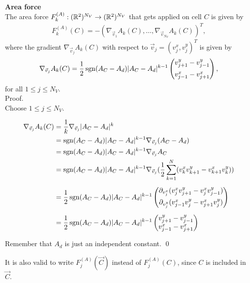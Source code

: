 \begin{proposition} \textbf{Area force} \label{force:area}\\
	The area force $F_{k}^{(A)}: (\mathbb{R}^2)^{N_V} \rightarrow (\mathbb{R}^2)^{N_V}$ that gets applied on cell $C$ is given by  
	\begin{align*}
		F_{k}^{(A)}(C) 
		= - (\nabla_{\vec{v}_1} A_k(C), \ldots, \nabla_{\vec{v}_{N_V}} A_k(C))^T,
	\end{align*}
	where the gradient $\nabla_{\vec{v}_j} A_k(C)$ with respect to $\vec{v}_j = (v_{j}^{x}, v_{j}^{y})^T$ is given by 
	\begin{align}
		\nabla_{\vec{v}_j} A_k(C) = \dfrac{1}{2} \operatorname{sgn}(A_{C} - A_d) |A_{C} - A_d|^{k-1} \begin{pmatrix} v_{j+1}^{y} - v_{j-1}^{y} \\[0.5em]  v_{j-1}^{x} - v_{j+1}^{x} \end{pmatrix},
		\label{gradient:area}
	\end{align}
	for all $1 \leq j \leq N_V$.\\


	Proof.\\
	Choose $1 \leq j \leq N_V$.  
 
	\begin{align*}
		\nabla_{\vec{v}_j} A_k(C) &= \frac{1}{k} \nabla_{\vec{v}_j} | A_{C} - A_d |^k  \\ 
		&= \operatorname{sgn}(A_{C} - A_d) | A_{C} - A_d |^{k-1} \nabla_{\vec{v}_j} (A_{C} - A_d) \\
		&= \operatorname{sgn}(A_{C} - A_d) | A_{C} - A_d |^{k-1} \nabla_{\vec{v}_j} A_{C} \\
		&= \operatorname{sgn}(A_{C} - A_d) | A_{C} - A_d |^{k-1} \nabla_{\vec{v}_j} (\frac{1}{2} \sum\limits_{k = 1}^{N} (v_k^{x} v_{k+1}^{y} - v_{k+1}^{x} v_k^{y})) \\[0.5em]  
		&= \frac{1}{2} \operatorname{sgn}(A_{C} - A_d) | A_{C} - A_d |^{k-1} \begin{pmatrix}
				\partial_{v_j^{x}} (v_j^{x} v_{j+1}^{y} - v_j^{x} v_{j-1}^{y})  \\[0.5em]
				\partial_{v_j^{y}} (v_{j-1}^{x} v_j^{y} - v_{j+1}^{x} v_j^{y})
			\end{pmatrix} \\[0.5em] 
		&= \frac{1}{2} \operatorname{sgn}(A_{C} - A_d) | A_{C} - A_d |^{k-1} \begin{pmatrix}
				v_{j+1}^{y} - v_{j-1}^{y}  \\
				v_{j-1}^{x}  - v_{j+1}^{x} 
			\end{pmatrix} 
	\end{align*}

	Remember that $A_d$ is just an independent constant. 
	\qed
\end{proposition}
It is also valid to write $F_{j}^{(A)}(\vec{C})$ instead of $F_{j}^{(A)}(C)$, since $C$ is included in $\vec{C}$. 


